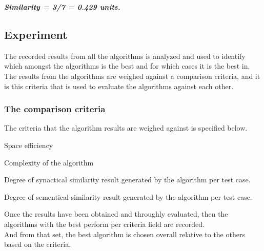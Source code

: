 \textbf{\textit{Similarity = 3/7 = 0.429 units.}}\\

\subsection{Experiment}
The recorded results from all the algorithms is analyzed and used to identify which amongst the algorithms is the best and for which cases it is the best in.\\
The results from the algorithms are weighed against a comparison criteria, and it is this criteria that is used to evaluate the algorithms against each other.\\

\subsubsection{The comparison criteria}
The criteria that the algorithm results are weighed against is specified below.
\begin{myEnumerate}
	\item Space efficiency
	\item Complexity of the algorithm
	\item Degree of synactical similarity result generated by the algorithm per test case.
	\item Degree of sementical similarity result generated by the algorithm per test case.
 \end{myEnumerate}
 \break
 
Once the results have been obtained and throughly evaluated, then the algorithms with the best perform per criteria field are recorded.\\
And from that set, the best algorithm is chosen overall relative to the others based on the criteria.